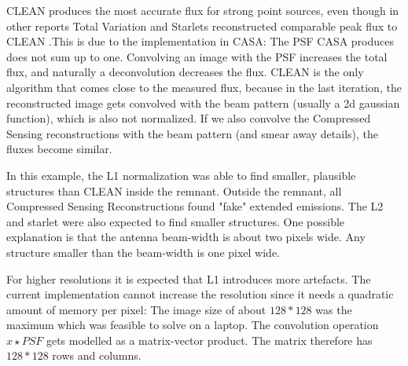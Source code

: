 CLEAN produces the most accurate flux for strong point sources, even though in other reports Total Variation and Starlets reconstructed comparable peak flux to CLEAN \cite{lofar2}\cite{mcewen2011compressed}.This is due to the implementation in CASA: The PSF CASA produces does not sum up to one. Convolving an image with the PSF increases the total flux, and naturally a deconvolution decreases the flux. CLEAN is the only algorithm that comes close to the measured flux, because in the last iteration, the reconstructed image gets convolved with the beam pattern (usually a 2d gaussian function), which is also not normalized. If we also convolve the Compressed Sensing reconstructions with the beam pattern (and smear away details), the fluxes become similar.

In this example, the L1 normalization was able to find smaller, plausible structures than CLEAN inside the remnant. Outside the remnant, all Compressed Sensing Reconstructions found "fake" extended emissions. The L2 and starlet were also expected to find smaller structures. One possible explanation is that the antenna beam-width is about two pixels wide. Any structure smaller than the beam-width is one pixel wide.

For higher resolutions it is expected that L1 introduces more artefacts. The current implementation cannot increase the resolution since it needs a quadratic amount of memory per pixel: The image size of about $128*128$ was the maximum which was feasible to solve on a laptop. The convolution operation $x \star PSF$ gets modelled as a matrix-vector product. The matrix therefore has $128*128$ rows and columns.

